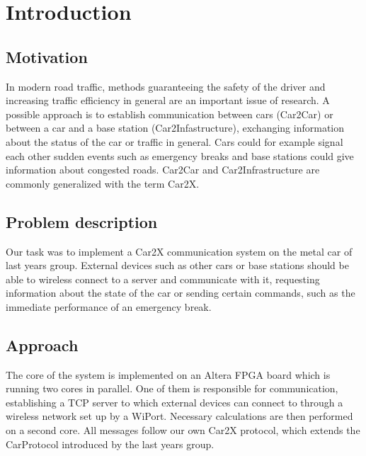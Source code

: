 \chapter{Introduction}


\section{Motivation}
In modern road traffic, methods guaranteeing the safety of the driver and increasing traffic efficiency in general are an important issue of research. 
A possible approach is to establish communication between cars (Car2Car) or between a car and a base station (Car2Infastructure), exchanging 
information about the status of the car or traffic in general. Cars could for example signal each other sudden events such as emergency breaks and base stations could give information about congested roads. Car2Car and Car2Infrastructure are commonly generalized with the term Car2X. 

\section{Problem description}
Our task was to implement a Car2X communication system on the metal car of last years group. 
External devices such as other cars or base stations should be able to wireless connect to a server and communicate with it,
requesting information about the state of the car or sending certain commands, such as the immediate performance of an emergency break. 

\section{Approach}
The core of the system is implemented on an Altera FPGA board which is running two cores in parallel. One of them is responsible for communication, establishing a TCP server to which external devices can connect to through a wireless network set up by a WiPort. Necessary calculations are then performed on a second core. All messages follow our own Car2X protocol, which extends the CarProtocol introduced by the last years group. 